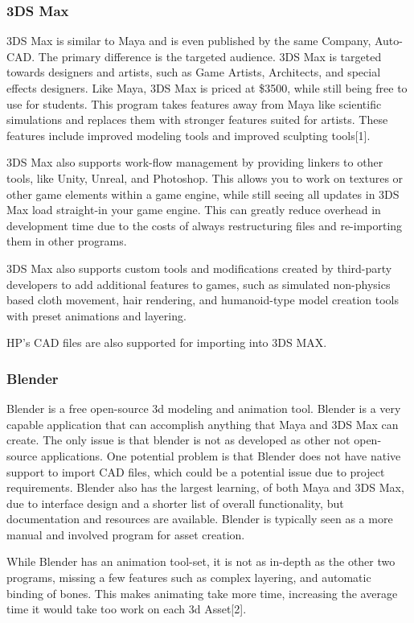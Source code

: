 \documentclass[onecolumn, draftclsnofoot,10pt, compsoc]{IEEEtran}
\begin{document}
\subsubsection{3DS Max}
3DS Max is similar to Maya and is even published by the same Company, Auto-CAD. The primary difference is the targeted audience. 3DS Max is targeted towards designers and artists, such as Game Artists, Architects, and special effects designers. Like Maya, 3DS Max is priced at \$3500, while still being free to use for students. This program takes features away from Maya like scientific simulations and replaces them with stronger features suited for artists. These features include improved modeling tools and improved sculpting tools[1]. 

3DS Max also supports work-flow management by providing linkers to other tools, like Unity, Unreal, and Photoshop. This allows you to work on textures or other game elements within a game engine, while still seeing all updates in 3DS Max load straight-in your game engine. This can greatly reduce overhead in development time due to the costs of always restructuring files and re-importing them in other programs. 

3DS Max also supports custom tools and modifications created by third-party developers to add additional features to games, such as simulated non-physics based cloth movement, hair rendering, and humanoid-type model creation tools with preset animations and layering.

HP’s CAD files are also supported for importing into 3DS MAX.

\subsubsection{Blender} 
Blender is a free open-source 3d modeling and animation tool. Blender is a very capable application that can accomplish anything that Maya and 3DS Max can create. The only issue is that blender is not as developed as other not open-source applications. One potential problem is that Blender does not have native support to import CAD files, which could be a potential issue due to project requirements. Blender also has the largest learning, of both Maya and 3DS Max, due to interface design and a shorter list of overall functionality, but documentation and resources are available. Blender is typically seen as a more manual and involved program for asset creation. 

While Blender has an animation tool-set, it is not as in-depth as the other two programs, missing a few features such as complex layering, and automatic binding of bones. This makes animating take more time, increasing the average time it would take too work on each 3d Asset[2]. 
\end{document}
